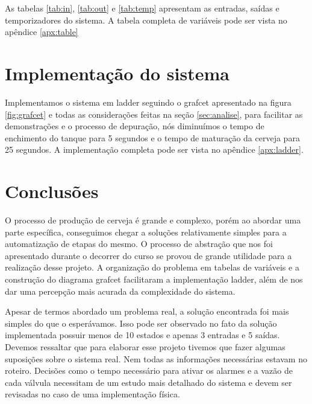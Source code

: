 \documentclass[twoside,twocolumn, 12pt]{paper}
\begin{document}
As tabelas \ref{tab:in}, \ref{tab:out} e \ref{tab:temp} apresentam as entradas, saídas e temporizadores do sistema. A tabela completa de variáveis pode ser vista no apêndice \ref{apx:table}

\section {Implementação do sistema}
\label{sec:ladder}
Implementamos o sistema em ladder seguindo o grafcet apresentado na figura \ref{fig:grafcet} e todas as considerações feitas na seção \ref{sec:analise}, para facilitar as demonstrações e o processo de depuração, nós diminuímos o tempo de enchimento do tanque para 5 segundos e o tempo de maturação da cerveja para 25 segundos. A implementação completa pode ser vista no apêndice \ref{apx:ladder}.

\section {Conclusões}
O processo de produção de cerveja é grande e complexo, porém ao abordar uma parte específica, conseguimos chegar a soluções relativamente simples para a automatização de etapas do mesmo. O processo de abstração que nos foi apresentado durante o decorrer do curso se provou de grande utilidade para a realização desse projeto. A organização do problema em tabelas de variáveis e a construção do diagrama grafcet facilitaram a implementação ladder, além de nos dar uma percepção mais acurada da complexidade do sistema.

Apesar de termos abordado um problema real, a solução encontrada foi mais simples do que o esperávamos. Isso pode ser observado no fato da solução implementada possuir menos de 10 estados e apenas 3 entradas e 5 saídas. Devemos ressaltar que para elaborar esse projeto tivemos que fazer algumas suposições sobre o sistema real. Nem todas as informações necessárias estavam no roteiro. Decisões como o tempo necessário para ativar os alarmes e a vazão de cada válvula necessitam de um estudo mais detalhado do sistema e devem ser revisadas no caso de uma implementação física.
\newpage
\clearpage
\appendix
\end{document}
